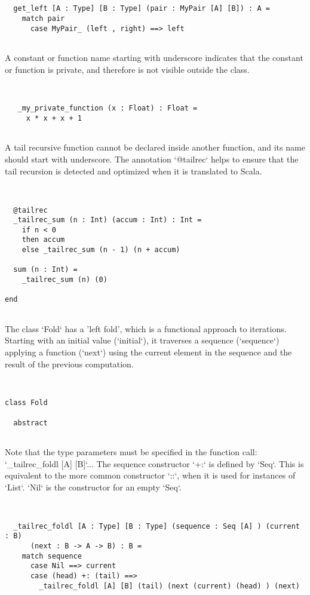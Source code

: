 \documentclass[12pt,a4paper]{article}
\begin{document}
\begin{lstlisting}


  get_left [A : Type] [B : Type] (pair : MyPair [A] [B]) : A =
    match pair
      case MyPair_ (left , right) ==> left


\end{lstlisting}

A constant or function name starting with underscore indicates that the constant or
function is private, and therefore is not visible outside the class.


\begin{lstlisting}


   _my_private_function (x : Float) : Float =
     x * x + x + 1


\end{lstlisting}

A tail recursive function cannot be declared inside another function, and its name should
start with underscore. The annotation `@tailrec` helps to ensure that the tail recursion
is detected and optimized when it is translated to Scala.


\begin{lstlisting}


  @tailrec
  _tailrec_sum (n : Int) (accum : Int) : Int =
    if n < 0
    then accum
    else _tailrec_sum (n - 1) (n + accum)

  sum (n : Int) =
    _tailrec_sum (n) (0)

end


\end{lstlisting}

The class `Fold` has a 'left fold', which is a functional approach to iterations. Starting
with an initial value (`initial`), it traverses a sequence (`sequence`) applying a function
(`next`) using the current element in the sequence and the result of the previous
computation.


\begin{lstlisting}


class Fold

  abstract


\end{lstlisting}

Note that the type parameters must be specified in the function call:
`_tailrec_foldl [A] [B]`...
The sequence constructor `+:` is defined by `Seq`.
This is equivalent to the more common constructor `::`, when it is used for instances of
`List`. `Nil` is the constructor for an empty `Seq`.


\begin{lstlisting}


  _tailrec_foldl [A : Type] [B : Type] (sequence : Seq [A] ) (current : B)
      (next : B -> A -> B) : B =
    match sequence
      case Nil ==> current
      case (head) +: (tail) ==>
        _tailrec_foldl [A] [B] (tail) (next (current) (head) ) (next)


\end{lstlisting}
\end{document}
